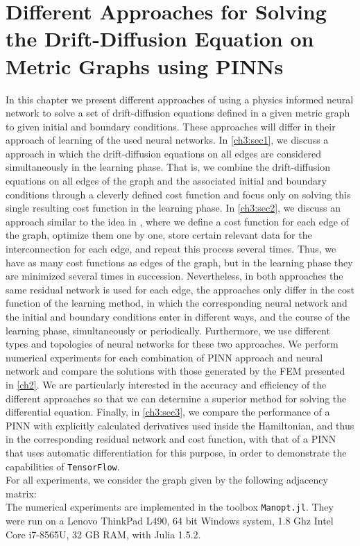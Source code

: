 \chapter{Different Approaches for Solving the Drift-Diffusion Equation on Metric Graphs using PINNs}

In this chapter we present different approaches of using a physics informed neural network to solve a set of drift-diffusion equations defined in a given metric graph to given initial and boundary conditions. These approaches will differ in their approach of learning of the used neural networks. In \cref{ch3:sec1}, we discuss a approach in which the drift-diffusion equations on all edges are considered simultaneously in the learning phase. That is, we combine the drift-diffusion equations on all edges of the graph and the associated initial and boundary conditions through a cleverly defined cost function and focus only on solving this single resulting cost function in the learning phase. In \cref{ch3:sec2}, we discuss an approach similar to the idea in \cite{JagtapKharazmiKarniadakis:2020}, where we define a cost function for each edge of the graph, optimize them one by one, store certain relevant data for the interconnection for each edge, and repeat this process several times. Thus, we have as many cost functions as edges of the graph, but in the learning phase they are minimized several times in succession. Nevertheless, in both approaches the same residual network is used for each edge, the approaches only differ in the cost function of the learning method, in which the corresponding neural network and the initial and boundary conditions enter in different ways, and the course of the learning phase, simultaneously or periodically. Furthermore, we use different types and topologies of neural networks for these two approaches. We perform numerical experiments for each combination of PINN approach and neural network and compare the solutions with those generated by the FEM presented in \cref{ch2}. We are particularly interested in the accuracy and efficiency of the different approaches so that we can determine a superior method for solving the differential equation. Finally, in \cref{ch3:sec3}, we compare the performance of a PINN with explicitly calculated derivatives used inside the Hamiltonian, and thus in the corresponding residual network and cost function, with that of a PINN that uses automatic differentiation for this purpose, in order to demonstrate the capabilities of \lstinline!TensorFlow!. \\
For all experiments, we consider the graph given by the following adjacency matrix: \\

The numerical experiments are implemented in the toolbox \lstinline!Manopt.jl!. They were run on a Lenovo ThinkPad L490, 64 bit Windows system, 1.8 Ghz Intel Core i7-8565U, 32 GB RAM, with Julia 1.5.2.



